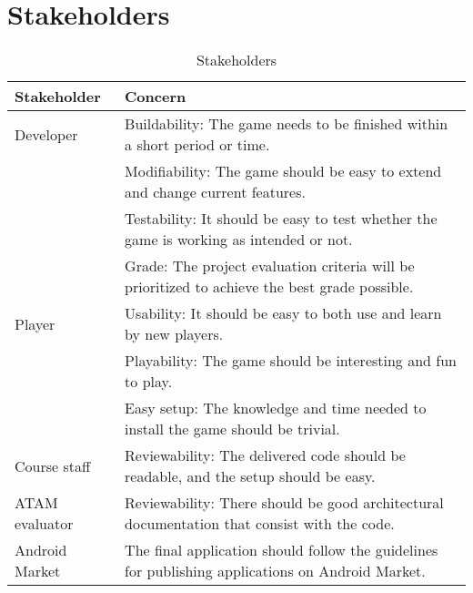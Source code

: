 \section{Stakeholders}

\begin{table}[h!]
\begin{tabular}{ | p{90pt} | p{270pt}  |}
\hline
\bf Stakeholder &  \bf Concern  \\ \hline
Developer & Buildability: The game needs to be finished within a short period or time. \\
&  Modifiability: The game should be easy to extend and change current features. \\
& Testability: It should be easy to test whether the game is working as intended or not.\\
& Grade: The project evaluation criteria will be prioritized to achieve the best grade possible. \\ \hline 
Player & Usability: It should be easy to both use and learn by new players. \\
& Playability: The game should be interesting and fun to play. \\
& Easy setup: The knowledge and time needed to install the game should be trivial. \\ \hline
Course staff & Reviewability: The delivered code should be readable, and the setup should be easy. \\ \hline
ATAM evaluator & Reviewability: There should be good architectural documentation that consist with the code.  \\ \hline
Android Market & The final application should follow the guidelines for publishing applications on Android Market. \\ \hline
\end{tabular}

\caption{Stakeholders}

\end{table}




